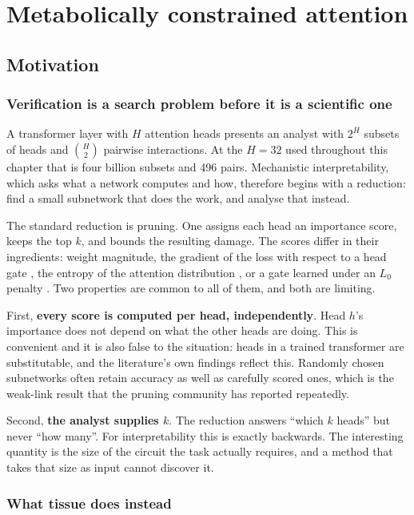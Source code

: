 \documentclass[11pt]{report}
\theoremstyle{plain}
\theoremstyle{definition}
\theoremstyle{remark}
\begin{document}
\chapter{Metabolically constrained attention}

\section{Motivation}

\subsection{Verification is a search problem before it is a scientific one}

A transformer layer with $H$ attention heads presents an analyst with $2^H$ subsets of
heads and $\binom{H}{2}$ pairwise interactions. At the $H = 32$ used throughout this
chapter that is four billion subsets and 496 pairs. Mechanistic interpretability, which
asks what a network computes and how, therefore begins with a reduction: find a small
subnetwork that does the work, and analyse that instead.

The standard reduction is pruning. One assigns each head an importance score, keeps the
top $k$, and bounds the resulting damage. The scores differ in their ingredients: weight
magnitude, the gradient of the loss with respect to a head gate \cite{michel2019}, the
entropy of the attention distribution \cite{zhai2023}, or a gate learned under an $L_0$
penalty \cite{voita2019}. Two properties are common to all of them, and both are
limiting.

First, \textbf{every score is computed per head, independently}. Head $h$'s importance
does not depend on what the other heads are doing. This is convenient and it is also
false to the situation: heads in a trained transformer are substitutable, and the
literature's own findings reflect this. Randomly chosen subnetworks often retain accuracy
as well as carefully scored ones, which is the weak-link result that the pruning
community has reported repeatedly.

Second, \textbf{the analyst supplies $k$}. The reduction answers ``which $k$ heads'' but
never ``how many''. For interpretability this is exactly backwards. The interesting
quantity is the size of the circuit the task actually requires, and a method that takes
that size as input cannot discover it.

\subsection{What tissue does instead}
\end{document}
